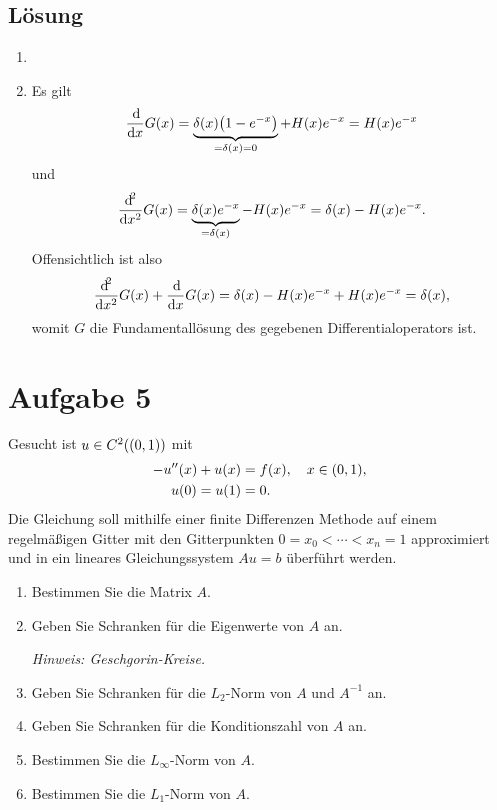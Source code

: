 \documentclass{exercise}
\begin{document}
    \subsection*{Lösung}
    \begin{enumerate}
        \item
        \item Es gilt
        \[
            \frac{\d}{\d x}G\parentheses*{x} = \underbrace{\delta\parentheses*{x}\parentheses*{1 - e^{-x}}}_{= \delta\parentheses*{x} = 0} + H\parentheses*{x}e^{-x} = H\parentheses*{x}e^{-x}
        \]
        und
        \[
            \frac{\d^2}{\d x^2}G\parentheses*{x} = \underbrace{\delta\parentheses*{x}e^{-x}}_{= \delta\parentheses*{x}} - H\parentheses*{x}e^{-x} = \delta\parentheses*{x} - H\parentheses*{x}e^{-x}.
        \]
        Offensichtlich ist also
        \[
            \frac{\d^2}{\d x^2}G\parentheses*{x} + \frac{\d}{\d x}G\parentheses*{x} = \delta\parentheses*{x} - H\parentheses*{x}e^{-x} + H\parentheses*{x}e^{-x} = \delta\parentheses*{x},
        \]
        womit \(G\) die Fundamentallösung des gegebenen Differentialoperators ist.
    \end{enumerate}


    \section*{Aufgabe 5}
    
    \begin{problem}
        Gesucht ist \(u \in C^2\parentheses*{\parentheses*{0, 1}}\) mit
        \begin{align*}
            -u''\parentheses*{x} + u\parentheses*{x} &= f\parentheses*{x}, \quad x \in \parentheses*{0, 1},\\
            u\parentheses*{0} = u\parentheses*{1} &= 0.
        \end{align*}
        Die Gleichung soll mithilfe einer finite Differenzen Methode auf einem regelmäßigen Gitter mit den Gitterpunkten \(0 = x_0 < \cdots < x_n = 1\) approximiert und in ein lineares Gleichungssystem \(Au = b\) überführt werden.
        \begin{enumerate}
            \item Bestimmen Sie die Matrix \(A\).
            \item Geben Sie Schranken für die Eigenwerte von \(A\) an.

            \emph{Hinweis: Geschgorin-Kreise.}
            \item Geben Sie Schranken für die \(L_2\)-Norm von \(A\) und \(A^{-1}\) an.
            \item Geben Sie Schranken für die Konditionszahl von \(A\) an.
            \item Bestimmen Sie die \(L_\infty\)-Norm von \(A\).
            \item Bestimmen Sie die \(L_1\)-Norm von \(A\).
        \end{enumerate}
    \end{problem}
    
\end{document}
